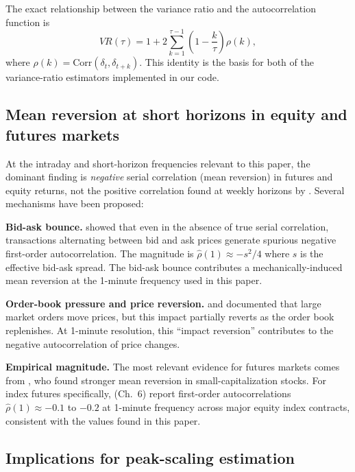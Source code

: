 \documentclass[12pt,a4paper]{article}
\begin{document}
The exact relationship between the variance ratio and the autocorrelation
function is
\begin{equation}
  VR(\tau)
  = 1 + 2\sum_{k=1}^{\tau-1}\!\left(1 - \frac{k}{\tau}\right)\rho(k),
  \label{eq:vr_rho}
\end{equation}
where $\rho(k) = \mathrm{Corr}(\delta_t, \delta_{t+k})$. This identity is the
basis for both of the variance-ratio estimators implemented in our code.

\subsection{Mean reversion at short horizons in equity and futures markets}

At the intraday and short-horizon frequencies relevant to this paper,
the dominant finding is \textit{negative} serial correlation (mean reversion)
in futures and equity returns, not the positive correlation found at weekly
horizons by \textcite{LoMacKinlay1988}. Several mechanisms have been proposed:

\textbf{Bid-ask bounce.} \textcite{Roll1984} showed that even in the absence
of true serial correlation, transactions alternating between bid and ask prices
generate spurious negative first-order autocorrelation. The magnitude is
$\hat\rho(1) \approx -s^2/4$ where $s$ is the effective bid-ask spread. The
bid-ask bounce contributes a mechanically-induced mean reversion at the 1-minute
frequency used in this paper.

\textbf{Order-book pressure and price reversion.} \textcite{Bouchaud2004}
and \textcite{Farmer2006} documented that large market orders move prices, but
this impact partially reverts as the order book replenishes. At 1-minute
resolution, this ``impact reversion'' contributes to the negative
autocorrelation of price changes.

\textbf{Empirical magnitude.} The most relevant evidence for futures markets
comes from \textcite{LoMacKinlay1990}, who found stronger mean reversion in
small-capitalization stocks. For index futures specifically,
\textcite{BouchaudPotters2003} (Ch.~6) report first-order autocorrelations
$\hat\rho(1) \approx -0.1$ to $-0.2$ at 1-minute frequency across major equity
index contracts, consistent with the values found in this paper.

\subsection{Implications for peak-scaling estimation}
\end{document}
